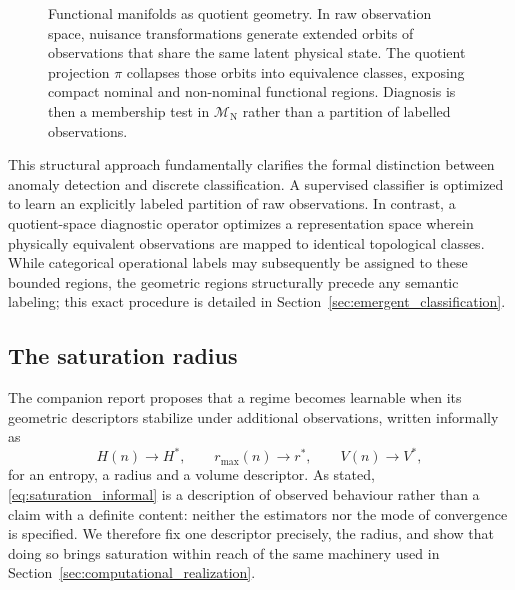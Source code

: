 \documentclass[a4paper]{cas-sc}
\newcommand{\Mnominal}{\ensuremath{\mathcal{M}_{\mathrm{N}}}}
\begin{document}
\begin{figure}[htbp]
\caption{Functional manifolds as quotient geometry. In raw observation space,
nuisance transformations generate extended orbits of observations that share
the same latent physical state. The quotient projection \(\pi\) collapses
those orbits into equivalence classes, exposing compact nominal and
non-nominal functional regions. Diagnosis is then a membership test in
\(\Mnominal\) rather than a partition of labelled observations.}
\label{fig:quotient_manifold_concept}
\end{figure}

This structural approach fundamentally clarifies the formal distinction between anomaly detection and discrete classification. A supervised classifier is optimized to learn an explicitly labeled partition of raw observations. In contrast, a quotient-space diagnostic operator optimizes a representation space wherein physically equivalent observations are mapped to identical topological classes. While categorical operational labels may subsequently be assigned to these bounded regions, the geometric regions structurally precede any semantic labeling; this exact procedure is detailed in Section~\ref{sec:emergent_classification}.

\subsection{The saturation radius}
\label{subsec:saturation_radius}

The companion report \citep{disanti2026inverse} proposes that a regime becomes
learnable when its geometric descriptors stabilize under additional
observations, written informally as
\begin{equation}
H(n)\to H^*,\qquad
r_{\max}(n)\to r^*,\qquad
V(n)\to V^*,
\label{eq:saturation_informal}
\end{equation}
for an entropy, a radius and a volume descriptor. As stated,
\eqref{eq:saturation_informal} is a description of observed behaviour rather
than a claim with a definite content: neither the estimators nor the mode of
convergence is specified. We therefore fix one descriptor precisely, the
radius, and show that doing so brings saturation within reach of the same
machinery used in Section~\ref{sec:computational_realization}.
\end{document}
